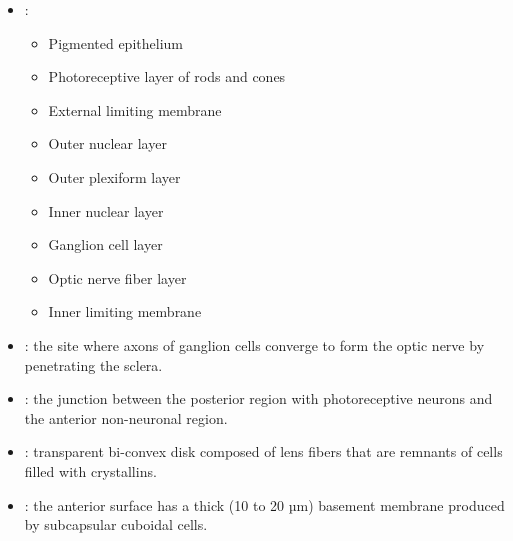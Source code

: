 \begin{multicols}{2}
\begin{itemize}
  \item {}:
    \begin{itemize}
      \item Pigmented epithelium
      \item Photoreceptive layer of rods and cones 
      \item External limiting membrane
      \item Outer nuclear layer
      \item Outer plexiform layer
      \item Inner nuclear layer
      \item Ganglion cell layer
      \item Optic nerve fiber layer
      \item Inner limiting membrane
    \end{itemize}
  
  \begin{center}
  \end{center}
  
  \item {}: the site where axons of ganglion cells converge to form the optic nerve by penetrating the sclera.
  
  \begin{center}
  \end{center}
  
  \item {}: the junction between the posterior region with photoreceptive neurons and the anterior non-neuronal region.
  
  \begin{center}
  \end{center}
  
  \item {}:  transparent bi-convex disk composed of lens fibers that are remnants of cells filled with crystallins.
  
  \begin{center}
  \end{center}
  
  \item {}: the anterior surface has a thick (10 to 20 µm) basement membrane produced by subcapsular cuboidal cells.
  
  \begin{center}
  \end{center}
  
\end{itemize}
\end{multicols}

